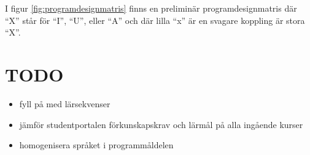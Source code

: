 \documentclass[twocolumn]{article}
\begin{document}
I figur \ref{fig:programdesignmatris} finns en preliminär
programdesignmatris där ``X'' står för ``I'', ``U'', eller ``A'' och
där lilla ``x'' är en svagare koppling är stora ``X''.

\appendix

% 
\section{TODO}
\begin{itemize}
\item fyll på med lärsekvenser
\item jämför studentportalen förkunskapskrav och lärmål på alla ingående kurser
\item homogenisera språket i programmåldelen
\end{itemize}

\end{document}
